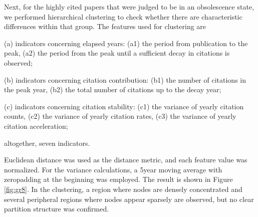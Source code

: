Next, for the highly cited papers that were judged to be in an obsolescence state, we performed hierarchical clustering to check whether there are characteristic differences within that group. The features used for clustering are  

(a) indicators concerning elapsed years:
(a1) the period from publication to the peak,
(a2) the period from the peak until a sufficient decay in citations is observed;

(b) indicators concerning citation contribution:
(b1) the number of citations in the peak year,
(b2) the total number of citations up to the decay year;

(c) indicators concerning citation stability:
(c1) the variance of yearly citation counts,
(c2) the variance of yearly citation rates,
(c3) the variance of yearly citation acceleration;

altogether, seven indicators.  

Euclidean distance was used as the distance metric, and each feature value was normalized. For the variance calculations, a 5year moving average with zeropadding at the beginning was employed. The result is shown in Figure \ref{fig:gr8}. In the clustering, a region where nodes are densely concentrated and several peripheral regions where nodes appear sparsely are observed, but no clear partition structure was confirmed.
